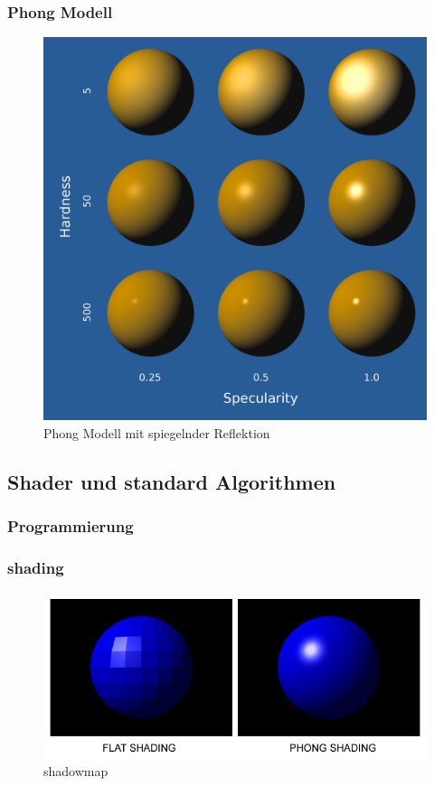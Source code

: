\subsubsection{Phong Modell}
\begin{figure}[H]
    \centering
    \includegraphics[width=1.0\textwidth]{images/phong.png}
    \caption{Phong Modell mit spiegelnder Reflektion }
\end{figure}





\subsection{Shader und standard Algorithmen}
\subsubsection{Programmierung}

\subsubsection{shading}
\begin{figure}[H]
    \centering
    \includegraphics[width=1.0\textwidth]{images/phong_flat_shading.jpg}
    \caption{shadowmap}
\end{figure}

